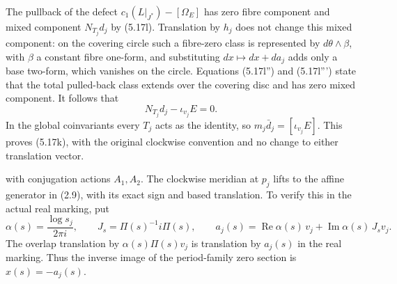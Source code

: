 The pullback of the defect
\(c_1(L|_{J^*})-[\Omega_E]\) has zero fibre component and mixed
component \(N_{T_j}d_j\) by (5.17l).  Translation by \(h_j\) does
not change this mixed component: on the covering circle such
a fibre-zero class is represented by
\(d\theta\wedge\beta\), with \(\beta\) a constant fibre one-form,
and substituting \(dx\mapsto dx+d a_j\) adds only a base two-form,
which vanishes on the circle.  Equations (5.17l'') and
(5.17l''') state that the total pulled-back class extends over
the covering disc and has zero mixed component.  It follows that
\[
 N_{T_j}d_j-\iota_{v_j}E=0.
\]
In the global coinvariants every \(T_j\) acts as the identity,
so \(m_j\bar d_j=[\iota_{v_j}E]\).  This proves (5.17k), with the
original clockwise convention and no change to either translation
vector.


with conjugation actions \(A_1,A_2\).  The clockwise meridian at
\(p_j\) lifts to the affine generator in (2.9), with its exact
sign and based translation.  To verify this in the actual
real marking, put
\[
 \alpha(s)=\frac{\log s_j}{2\pi i},\qquad
 J_s=\Pi(s)^{-1}i\Pi(s),\qquad
 a_j(s)=\operatorname{Re}\alpha(s)\,v_j+
        \operatorname{Im}\alpha(s)\,J_s v_j.
\]
The overlap translation by
\(\alpha(s)\Pi(s)v_j\) is translation by \(a_j(s)\) in the real
marking.  Thus the inverse image of the period-family zero section
is \(x(s)=-a_j(s)\).

